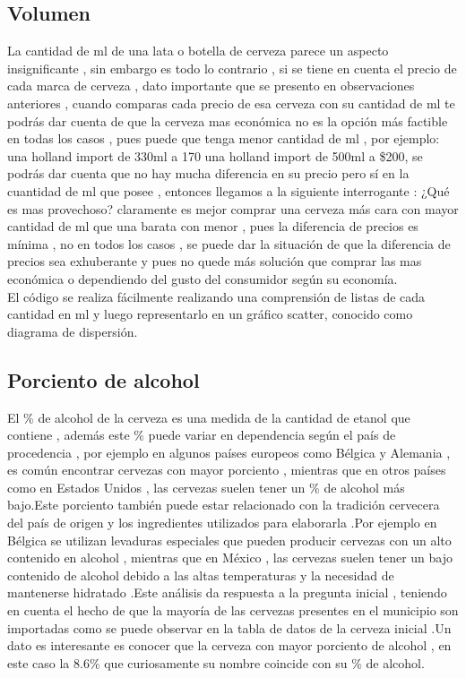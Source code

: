 \documentclass[twocolumn,12pt]{article}
\begin{document}
\subsection{Volumen}

La cantidad de ml de una lata o botella de cerveza parece un aspecto insignificante , sin embargo es todo lo contrario , si se tiene en cuenta el precio de cada marca de cerveza , dato importante que se presento en observaciones anteriores , cuando comparas cada precio de esa cerveza con su cantidad de ml te podrás dar cuenta de que la cerveza mas económica no es la opción más factible en todas los casos , pues puede que tenga menor cantidad de ml , por ejemplo: una holland import de 330ml a 170  una holland import de 500ml a \$200, se podrás dar cuenta que no hay mucha diferencia en su precio pero sí en  la cuantidad  de ml que posee , entonces llegamos a la siguiente interrogante : ¿Qué es mas provechoso? claramente es mejor comprar una cerveza más cara con mayor cantidad de ml que una barata con menor , pues la diferencia de precios es mínima , no en todos los casos , se puede dar la situación de que la diferencia de precios sea exhuberante y pues no quede más solución que comprar las mas económica o dependiendo del gusto del consumidor según su economía.\\

El código se realiza fácilmente realizando una comprensión de listas de cada cantidad en ml y luego representarlo en un gráfico scatter, conocido como diagrama de dispersión.

\subsection{Porciento de alcohol}

El \% de alcohol de la cerveza es una medida de la cantidad de etanol que contiene , además este \% puede variar en dependencia según el país de procedencia , por ejemplo en algunos países europeos como Bélgica y Alemania , es común encontrar cervezas con mayor porciento , mientras que en otros países como en Estados Unidos , las cervezas suelen tener un \% de alcohol más bajo.Este porciento también puede estar relacionado con la tradición cervecera del país de origen y los ingredientes utilizados para elaborarla .Por ejemplo en Bélgica se utilizan levaduras especiales que pueden producir cervezas con un  alto contenido en alcohol , mientras que en México , las cervezas suelen tener un bajo contenido de alcohol debido a las altas temperaturas y la necesidad de mantenerse hidratado .Este análisis da respuesta a la pregunta inicial , teniendo en cuenta el hecho de que la mayoría de las cervezas presentes en el municipio son importadas como se puede observar en la tabla de datos de la cerveza inicial .Un dato es interesante es conocer que la cerveza con mayor porciento de alcohol , en este caso la 8.6\% que curiosamente su nombre coincide con su \% de alcohol.\\
\end{document}
